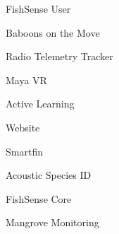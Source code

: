 \item FishSense User
\item Baboons on the Move
\item Radio Telemetry Tracker
\item Maya VR
\item Active Learning
\item Website
\item Smartfin
\item Acoustic Species ID
\item FishSense Core
\item Mangrove Monitoring
